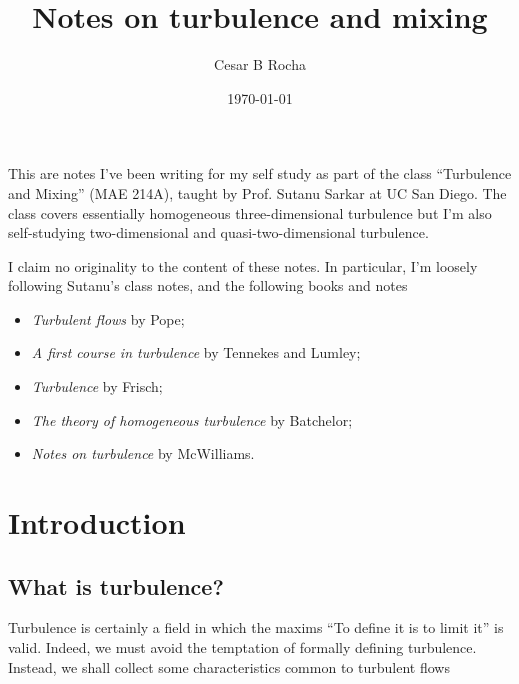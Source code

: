 \documentclass[11pt]{article}
\title{Notes on turbulence and mixing}
\author{Cesar B Rocha}
\date{\today}
\begin{document}


\maketitle

This are notes I've been writing for my self study as part of the class ``Turbulence and Mixing'' (MAE 214A), taught by Prof. Sutanu Sarkar at UC San Diego. The class covers essentially homogeneous three-dimensional turbulence but I'm also self-studying two-dimensional and quasi-two-dimensional turbulence. 

I claim no originality to the content of these notes.  In particular, I'm loosely following Sutanu's class notes, and the following books and notes

\begin{itemize}

    \item \textit{Turbulent flows} by Pope;

    \item \textit{A first course in turbulence} by Tennekes and Lumley;

    \item \textit{Turbulence} by Frisch;

    \item \textit{The theory of homogeneous turbulence} by Batchelor;

    \item \textit{Notes on turbulence} by McWilliams.

\end{itemize}

\section{Introduction}

\subsection{What is turbulence?}

Turbulence is certainly a field in which the maxims ``To define it is to limit it'' is valid. Indeed, we must avoid the temptation of formally defining turbulence. Instead, we shall collect some characteristics common to turbulent flows
\end{document}
